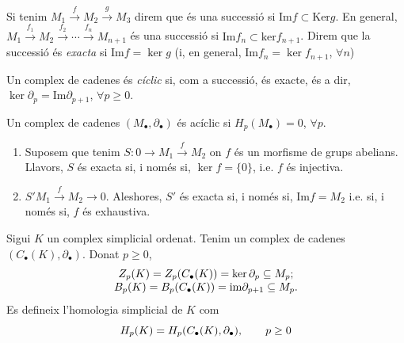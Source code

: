 \documentclass[../main.tex]{subfiles}
\begin{document}
\begin{defi}[Successió]
Si tenim $M_1\overset{f}{\longrightarrow}M_2\overset{g}{\longrightarrow}M_3$ direm que és una successió si $\mathrm{Im}f\subset\mathrm{Ker}g$. En general, $M_1\overset{f_1}{\longrightarrow}M_2\overset{f_2}{\longrightarrow}\cdots\overset{f_n}{\longrightarrow}M_{n+1}$ és una successió si $\mathrm{Im}f_n\subset \mathrm{ker}f_{n+1}$. Direm que la successió és \textit{exacta} si $\mathrm{Im}f=\ker g$ (i, en general, $\mathrm{Im}f_n=\ker f_{n+1}$, $\forall n$)
\end{defi}

\begin{defi}
Un complex de cadenes és \textit{cíclic}  si, com a successió, és exacte, és a dir, $\ker\partial_p = \mathrm{Im}\partial_{p+1}$, $\forall p\geq 0$.
\end{defi}

\begin{nota}
Un complex de cadenes $(M_\bullet,\partial_\bullet)$ és acíclic si $H_p(M_\bullet) = 0$, $\forall p$.
\end{nota}

\begin{ej}
\begin{enumerate}[(1)]
    \item Suposem que tenim $S:0\rightarrow M_1\overset{f}{\rightarrow}M_2$ on $f$ és un morfisme de grups abelians. Llavors, $S$ és exacta si, i només si, $\ker f = \{0\}$, i.e. $f$ és injectiva.
    \item $S'M_1\overset{f}{\rightarrow}M_2\rightarrow 0$. Aleshores, $S'$ és exacta si, i només si, $\mathrm{Im}f = M_2$ i.e. si, i només si, $f$ és exhaustiva.
\end{enumerate}
\end{ej}

\begin{defi}
Sigui $K$ un complex simplicial ordenat. Tenim un complex de cadenes $(C_\bullet(K),\partial_\bullet)$. Donat $p\geq 0$, 
\begin{equation}
    \notag
    \begin{array}{cc}
        Z_p(K) = Z_p(C_\bullet(K))=\ker\partial_p\subseteq M_p;\\
        B_p(K) = B_p(C_\bullet(K)) = \mathrm{im}\partial_{p+1}\subseteq M_p.
    \end{array}
\end{equation}
Es defineix l'homologia simplicial de $K$ com
\begin{equation}
    \notag
    H_p(K) = H_p(C_\bullet(K),\partial_\bullet),\qquad p\geq 0
\end{equation}
\end{defi}
\end{document}
